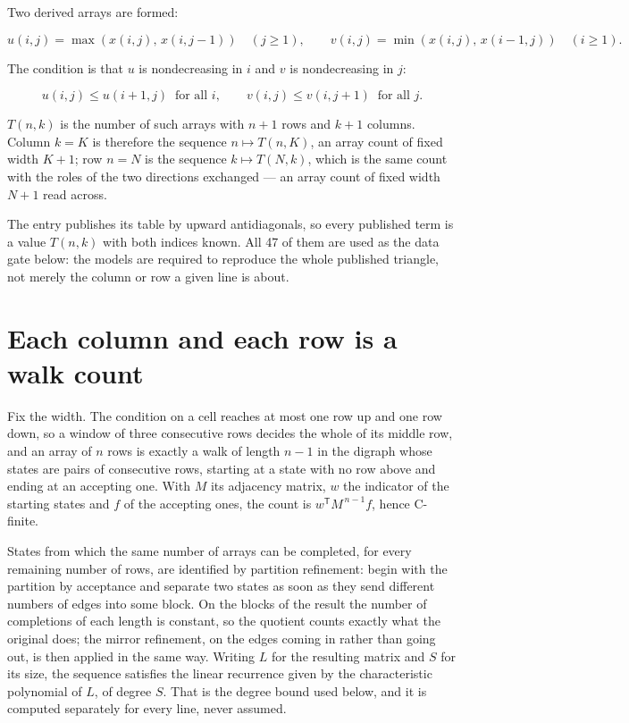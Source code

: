 \documentclass[11pt]{article}
\theoremstyle{definition}
\begin{document}
Two derived arrays are formed:

\[u(i,j) = \max(x(i,j),\,x(i,j{-}1))\quad (j \ge 1), \qquad v(i,j) = \min(x(i,j),\,x(i{-}1,j))\quad (i \ge 1).\]

The condition is that $u$ is nondecreasing in $i$ and $v$ is nondecreasing in $j$:

\[u(i,j) \le u(i{+}1,j) \ \text{ for all } i, \qquad v(i,j) \le v(i,j{+}1) \ \text{ for all } j.\]

$T(n,k)$ is the number of such arrays with $n + 1$ rows and $k + 1$ columns. Column $k = K$ is therefore the sequence $n \mapsto T(n,K)$, an array count of fixed width $K + 1$; row $n = N$ is the sequence $k \mapsto T(N,k)$, which is the same count with the roles of the two directions exchanged --- an array count of fixed width $N + 1$ read across.

The entry publishes its table by upward antidiagonals, so every published term is a value $T(n,k)$ with both indices known. All 47 of them are used as the data gate below: the models are required to reproduce the whole published triangle, not merely the column or row a given line is about.

\section{Each column and each row is a walk count}

Fix the width. The condition on a cell reaches at most one row up and one row down, so a window of three consecutive rows decides the whole of its middle row, and an array of $n$ rows is exactly a walk of length $n-1$ in the digraph whose states are pairs of consecutive rows, starting at a state with no row above and ending at an accepting one. With $M$ its adjacency matrix, $w$ the indicator of the starting states and $f$ of the accepting ones, the count is $w^{\mathsf T}M^{\,n-1}f$, hence C-finite.

States from which the same number of arrays can be completed, for every remaining number of rows, are identified by partition refinement: begin with the partition by acceptance and separate two states as soon as they send different numbers of edges into some block. On the blocks of the result the number of completions of each length is constant, so the quotient counts exactly what the original does; the mirror refinement, on the edges coming in rather than going out, is then applied in the same way. Writing $L$ for the resulting matrix and $S$ for its size, the sequence satisfies the linear recurrence given by the characteristic polynomial of $L$, of degree $S$. That is the degree bound used below, and it is computed separately for every line, never assumed.
\end{document}
